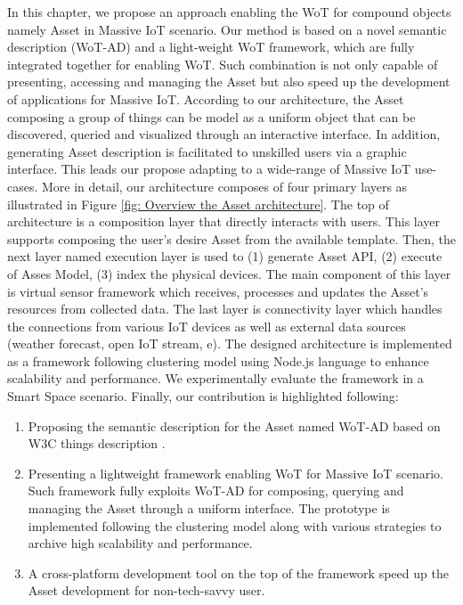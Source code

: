 In this chapter, we propose an approach enabling the WoT for compound objects namely Asset in Massive IoT scenario. Our method is based on a novel semantic description (WoT-AD) and a light-weight WoT framework, which are fully integrated together for enabling WoT. Such combination is not only capable of presenting, accessing and managing the Asset but also speed up the development of applications for Massive IoT. 
According to our architecture, the Asset composing a group of things can be model as a uniform object that can be discovered, queried and visualized through an interactive interface. 
In addition, generating Asset description is facilitated to unskilled users via a graphic interface. This leads our propose adapting to a wide-range of Massive IoT use-cases. More in detail, our architecture composes of four primary layers as illustrated in Figure \ref{fig: Overview the Asset architecture}. The top of architecture is a composition layer that directly interacts with users. This layer supports composing the user's desire Asset from the available template. Then, the next layer named execution layer is used to (1) generate Asset API, (2) execute of Asses Model, (3) index the physical devices. The main component of this layer is virtual sensor framework which receives, processes and updates the Asset's resources from collected data. The last layer is connectivity layer which handles the connections from various IoT devices as well as external data sources (weather forecast, open IoT stream, e). The designed architecture is implemented as a framework following clustering model using Node.js language to enhance scalability and performance. We experimentally evaluate the framework in a Smart Space scenario. Finally, our contribution is highlighted following:
\begin{enumerate}
	\item Proposing the semantic description for the Asset named WoT-AD based on W3C things description \cite{W3C_TD}.
	\item Presenting a lightweight framework enabling WoT for Massive IoT scenario. Such framework fully exploits WoT-AD for composing, querying and managing the Asset through a uniform interface. The prototype is implemented following the clustering model along with various strategies to archive high scalability and performance.
	\item A cross-platform development tool on the top of the framework speed up the Asset development for non-tech-savvy user. 
\end{enumerate}

